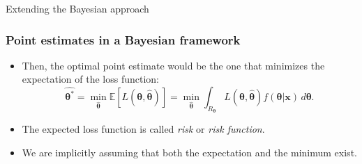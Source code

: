 \documentclass[10pt]{beamer}
\theoremstyle{definition}
\begin{document}
\begin{section}{Extending the Bayesian approach}
\begin{frame}[fragile]
\frametitle{Point estimates in a Bayesian framework}
\begin{itemize}\itemsep1em
\item Then, the optimal point estimate would be the one that minimizes the expectation of the loss function: \begin{equation}
\label{ExpLoss}
\boldsymbol{\hat{\theta^*}}=\min_{\boldsymbol{\hat{\theta}}}\mathbb{E}[L(\boldsymbol{\theta},\boldsymbol{\hat{\theta}})]=\min_{\boldsymbol{\hat{\theta}}}\int_{R_{\boldsymbol{\theta}}}
L(\boldsymbol{\theta},\boldsymbol{\hat{\theta}})f(\boldsymbol{\theta}|\mathbf{x})\,
d\boldsymbol{\theta}.
\end{equation} 
\item The expected loss function is called \emph{risk} or \emph{risk function}.
\item We are implicitly assuming that both the expectation and the minimum exist.
\end{itemize}
\end{frame}


\end{section}
\end{document}
